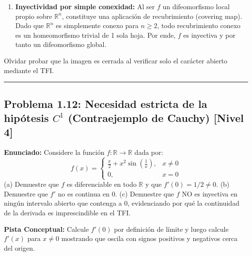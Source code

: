 \documentclass[11pt,a4paper]{article}
\begin{document}
\begin{enumerate}[label=\textbf{\arabic*.}]
\item \textbf{Inyectividad por simple conexidad:}
Al ser $f$ un difeomorfismo local propio sobre $\mathbb{R}^n$, constituye una aplicación de recubrimiento (covering map). Dado que $\mathbb{R}^n$ es simplemente conexo para $n \ge 2$, todo recubrimiento conexo es un homeomorfismo trivial de 1 sola hoja. Por ende, $f$ es inyectiva y por tanto un difeomorfismo global.
\end{enumerate}

\begin{trapbox}
Olvidar probar que la imagen es cerrada al verificar solo el carácter abierto mediante el TFI.
\end{trapbox}

\vspace{0.5cm}
\hrule
\vspace{0.5cm}

\subsection*{Problema 1.12: Necesidad estricta de la hipótesis $C^1$ (Contraejemplo de Cauchy) \hfill \color{primaryblue}\small[Nivel 4]}

\begin{tcolorbox}[colback=white,colframe=gray!40,arc=1mm,boxrule=0.5pt,left=3mm,right=3mm,top=2mm,bottom=2mm]
\textbf{Enunciado:} Considere la función $f: \mathbb{R} \to \mathbb{R}$ dada por:
\begin{equation*}
f(x) = \begin{cases} \frac{x}{2} + x^2 \sin\left(\frac{1}{x}\right), & x \neq 0 \\ 0, & x = 0 \end{cases}
\end{equation*}
(a) Demuestre que $f$ es diferenciable en todo $\mathbb{R}$ y que $f'(0) = 1/2 \neq 0$. (b) Demuestre que $f'$ no es continua en $0$. (c) Demuestre que $f$ NO es inyectiva en ningún intervalo abierto que contenga a $0$, evidenciando por qué la continuidad de la derivada es imprescindible en el TFI.
\end{tcolorbox}

\begin{tcolorbox}[colback=yellow!4,colframe=accentamber!70,arc=1mm,boxrule=0.5pt,left=3mm,right=3mm,top=1.5mm,bottom=1.5mm]
\textbf{Pista Conceptual:} Calcule $f'(0)$ por definición de límite y luego calcule $f'(x)$ para $x \neq 0$ mostrando que oscila con signos positivos y negativos cerca del origen.
\end{tcolorbox}
\end{document}
